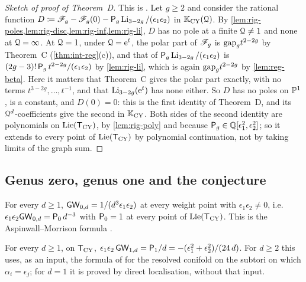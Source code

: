 \begin{proof}[Sketch of proof of Theorem~D]
This is . Let $g\geq2$ and consider the rational function $D\coloneqq\mathscr{F}_g-\mathscr{F}_g(0)-\mathsf{P}_{g}\operatorname{Li}_{3-2g}/(\epsilon_1\epsilon_2)$ in $\mathbb{K}_{\mathrm{CY}}(\mathcal{Q})$. By \cref{lem:rig-poles,lem:rig-disc,lem:rig-inf,lem:rig-li}, $D$ has no pole at a finite $\mathcal{Q}\neq1$ and none at $\mathcal{Q}=\infty$. At $\mathcal{Q}=1$, under $\mathcal{Q}=\mathrm{e}^t$, the polar part of $\mathscr{F}_g$ is $\mathrm{gap}_g t^{2-2g}$ by Theorem~C (\cref{thm:int-reg}(c)), and that of $\mathsf{P}_{g}\operatorname{Li}_{3-2g}/(\epsilon_1\epsilon_2)$ is $(2g-3)!\,\mathsf{P}_{g}\,t^{2-2g}/(\epsilon_1\epsilon_2)$ by \cref{lem:rig-li}, which is again $\mathrm{gap}_g t^{2-2g}$ by \cref{lem:reg-beta}. Here it matters that Theorem~C gives the polar part exactly, with no terms $t^{3-2g},\dots,t^{-1}$, and that $\operatorname{Li}_{3-2g}(\mathrm{e}^t)$ has none either. So $D$ has no poles on $\mathbb{P}^1$, is a constant, and $D(0)=0$: this is the first identity of Theorem~D, and its $\mathcal{Q}^d$-coefficients give the second in $\mathbb{K}_{\mathrm{CY}}$. Both sides of the second identity are polynomials on $\mathrm{Lie}(\mathsf{T}_{\mathrm{CY}})$, by \cref{lem:rig-poly} and because $\mathsf{P}_{g}\in\mathbb{Q}[\epsilon_1^2,\epsilon_2^2]$; so it extends to every point of $\mathrm{Lie}(\mathsf{T}_{\mathrm{CY}})$ by polynomial continuation, not by taking limits of the graph sum.
\end{proof}

\subsection{Genus zero, genus one and the conjecture}
\label{sec:rig-low}

\begin{prop}
\label{prop:rig-g0}
For every $d\geq1$, $\mathsf{GW}_{0,d}=1/(d^3\epsilon_1\epsilon_2)$ at every weight point with $\epsilon_1\epsilon_2\neq0$, i.e.\ $\epsilon_1\epsilon_2\mathsf{GW}_{0,d}=\mathsf{P}_{0}\,d^{-3}$ with $\mathsf{P}_{0}=1$ at every point of $\mathrm{Lie}(\mathsf{T}_{\mathrm{CY}})$. This is the Aspinwall--Morrison formula \cite[p.~3]{FP00}.
\end{prop}

\begin{lem}
\label{lem:rig-g1}
For every $d\geq 1$, on $\mathsf{T}_{\mathrm{CY}}$, $\epsilon_1\epsilon_2\,\mathsf{GW}_{1,d}=\mathsf{P}_{1}/d=-(\epsilon_1^2+\epsilon_2^2)/(24\,d)$. For $d\geq 2$ this uses, as an input, the formula of \cite{BS} for the resolved conifold on the subtori on which $\alpha_i=\epsilon_j$; for $d=1$ it is proved by direct localisation, without that input.
\end{lem}

